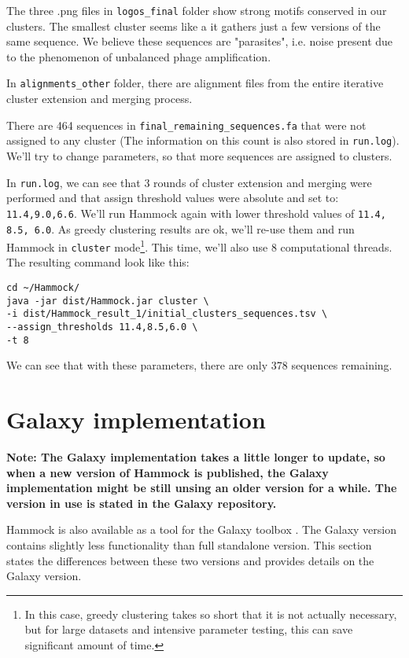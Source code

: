 \documentclass[11pt, a4paper, twoside, titlepage]{article}
\begin{document}
The three .png files in \texttt{logos\_final} folder show strong motifs conserved in our clusters. The smallest cluster seems like a it gathers just a few versions of the same sequence. We believe these sequences are "parasites", i.e. noise present due to the phenomenon of unbalanced phage amplification. 

In \texttt{alignments\_other} folder, there are alignment files from the entire iterative cluster extension and merging process.

There are 464 sequences in \texttt{final\_remaining\_sequences.fa} that were not assigned to any cluster (The information on this count is also stored in \texttt{run.log}). We'll try to change parameters, so that more sequences are assigned to clusters.

In \texttt{run.log}, we can see that 3 rounds of cluster extension and merging were performed and that assign threshold values were absolute and set to: \texttt{11.4,9.0,6.6}. We'll run Hammock again with lower threshold values of \texttt{11.4, 8.5, 6.0}. As greedy clustering results are ok, we'll re-use them and run Hammock in \texttt{cluster} mode\footnote{In this case, greedy clustering takes so short that it is not actually necessary, but for large datasets and intensive parameter testing, this can save significant amount of time.}. This time, we'll also use 8 computational threads. The resulting command look like this: 

\begin{verbatim}
cd ~/Hammock/
java -jar dist/Hammock.jar cluster \ 
-i dist/Hammock_result_1/initial_clusters_sequences.tsv \ 
--assign_thresholds 11.4,8.5,6.0 \ 
-t 8
\end{verbatim}

We can see that with these parameters, there are only 378 sequences remaining.


\section{Galaxy implementation}

\large\textbf{Note: The Galaxy implementation takes a little longer to update, so when a new version of Hammock is published, the Galaxy implementation might be still unsing an older version for a while. The version in use is stated in the Galaxy repository.}
\newline
\newline

Hammock is also available as a tool for the Galaxy toolbox \cite{Giardine2005}. The Galaxy version contains slightly less functionality than full standalone version. This section states the differences between these two versions and provides details on the Galaxy version. 
\end{document}

